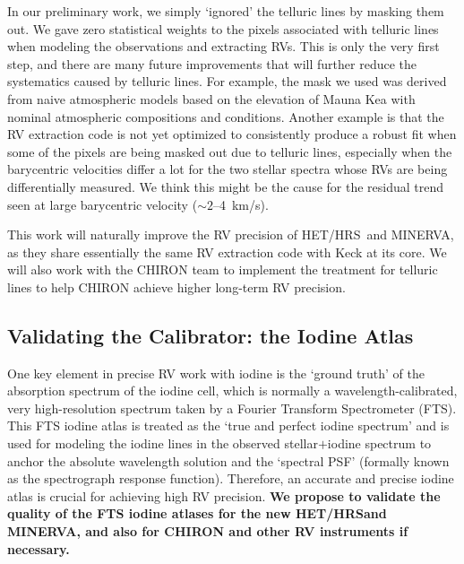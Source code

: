 \documentclass[12pt]{article}
\def\mps{m/s}
\def\minerva{MINERVA}
\def\hrs{HET/HRS}
\begin{document}
In our preliminary work, we simply `ignored' the telluric lines by
masking them out. We gave zero statistical weights to the pixels
associated with telluric lines when modeling the observations and
extracting RVs. This is only the very first step, and there are many
future improvements that will further reduce the systematics caused by
telluric lines. For example, the mask we used was derived from naive
atmospheric models based on the elevation of Mauna Kea with nominal
atmospheric compositions and conditions. Another example is that the
RV extraction code is not yet optimized to consistently produce a
robust fit when some of the pixels are being masked out due to
telluric lines, especially when the barycentric velocities differ a
lot for the two stellar spectra whose RVs are being differentially
measured. We think this might be the cause for the residual trend seen
at large barycentric velocity ($\sim2$--4~k\mps).

This work will naturally improve the RV precision of \hrs\ and
\minerva, as they share essentially the same RV extraction code with
Keck at its core. We will also work with the CHIRON team to implement
the treatment for telluric lines to help CHIRON achieve higher
long-term RV precision.

\vspace{-3pt}
\subsection{Validating the Calibrator: the Iodine Atlas}\label{sec:fts}

One key element in precise RV work with iodine is the `ground truth'
of the absorption spectrum of the iodine cell, which is normally a
wavelength-calibrated, very high-resolution spectrum taken by a
Fourier Transform Spectrometer (FTS). This FTS iodine atlas is treated
as the `true and perfect iodine spectrum' and is used for modeling the
iodine lines in the observed stellar$+$iodine spectrum to anchor the
absolute wavelength solution and the `spectral PSF' (formally known as
the spectrograph response function). Therefore, an accurate and
precise iodine atlas is crucial for achieving high RV
precision. \textbf{We propose to validate the quality of the FTS
  iodine atlases for the new \hrs and \minerva, and also for CHIRON
  and other RV instruments if necessary.}
\end{document}
